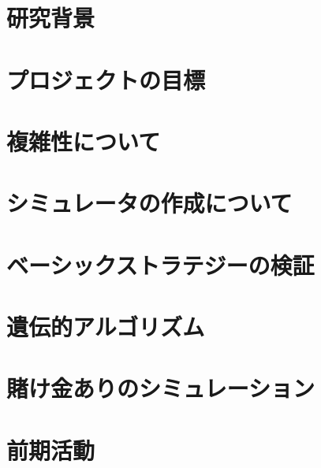 \documentclass[11pt,a4paper,oneside]{jsbook}
\begin{document}
\tableofcontents
\newpage


\chapter{研究背景}






\chapter{プロジェクトの目標}

\chapter{複雑性について}


\chapter{シミュレータの作成について}


\chapter{ベーシックストラテジーの検証}




\chapter{遺伝的アルゴリズム}



\chapter{賭け金ありのシミュレーション}



\chapter{前期活動}

%
\end{document}
